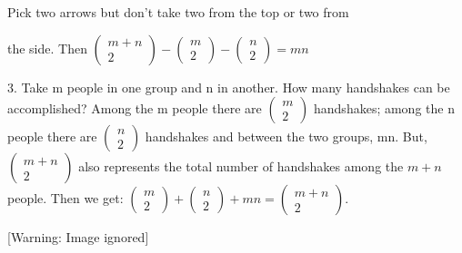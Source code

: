 \documentclass{article}
\begin{document}
Pick two arrows but don’t take two from the top or two from 

the side.  Then  
$\left(\begin{matrix}m+n\\2\end{matrix}\right)-\left(\begin{matrix}m\\2\end{matrix}\right)-\left(\begin{matrix}n\\2\end{matrix}\right)=\mathit{mn}$

3.  Take m people in one group and  n  in another. How many handshakes can be accomplished?  Among the m people there
are  $\left(\begin{matrix}m\\2\end{matrix}\right)$ handshakes; among the n people there are 
$\left(\begin{matrix}n\\2\end{matrix}\right)$ handshakes and between the two groups, mn.  But, 
$\left(\begin{matrix}m+n\\2\end{matrix}\right)$ also represents the total number of handshakes among the  $m+n$ people.
 Then we get: 
$\left(\begin{matrix}m\\2\end{matrix}\right)+\left(\begin{matrix}n\\2\end{matrix}\right)+\mathit{mn}=\left(\begin{matrix}m+n\\2\end{matrix}\right)$.

  [Warning: Image ignored] %
 
\end{document}
